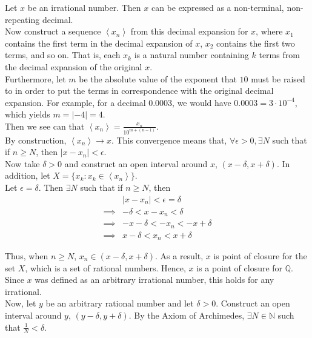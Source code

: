 \documentclass[12pt]{article}
\newenvironment{problem}[2][Problem]{\begin{trivlist}
\item[\hskip \labelsep {\bfseries #1}\hskip \labelsep {\bfseries #2.}]}{\end{trivlist}}
\begin{document}
\begin{problem}{5}
\end{problem}

Let $x$ be an irrational number. Then $x$ can be expressed as a non-terminal, non-repeating decimal.\\

Now construct a sequence $\left<x_n\right>$ from this decimal expansion for $x$, where $x_1$ contains the first term in the decimal expansion of $x$, $x_2$ contains the first two terms, and so on. That is, each $x_k$ is a natural number containing $k$ terms from the decimal expansion of the original $x$.\\

Furthermore, let $m$ be the absolute value of the exponent that $10$ must be raised to in order to put the terms in correspondence with the original decimal expansion. For example, for a decimal 0.0003, we would have $0.0003 = 3\cdot10^{-4}$, which yields $m = |-4| = 4$.\\

Then we see can that $\left<x_n\right> = \frac{x_n}{10^{m+(n-1)}}$.\\

By construction, $\left<x_n\right> \to x$. This convergence means that, $\forall \epsilon > 0, \exists N$ such that if $n \geq N$, then $| x - x_n | < \epsilon$.\\

Now take $\delta > 0$ and construct an open interval around $x$, $(x - \delta, x + \delta)$. In addition, let $X = \{x_k: x_k \in \left<x_n\right>\}$.\\

Let $\epsilon = \delta$. Then $\exists N$ such that if $n \geq N$, then
\begin{align*}
&| x - x_n | < \epsilon = \delta\\
\implies &-\delta < x - x_n < \delta\\
\implies &-x - \delta < - x_n < -x + \delta\\
\implies &x - \delta < x_n < x + \delta
\end{align*} 

Thus, when $n \geq N$, $x_n \in (x - \delta, x + \delta)$. As a result, $x$ is point of closure for the set $X$, which is a set of rational numbers. Hence, $x$ is a point of closure for $\mathbb{Q}$. Since $x$ was defined as an arbitrary irrational number, this holds for any irrational.\\

Now, let $y$ be an arbitrary rational number and let $\delta > 0$. Construct an open interval around $y$, $(y - \delta, y + \delta)$. By the Axiom of Archimedes, $\exists N \in \mathbb{N}$ such that $\frac{1}{N} < \delta$.\\
\end{document}
